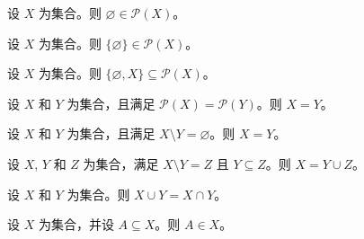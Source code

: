 \begin{chapex} %
设 $X$ 为集合。则 $\varnothing \in \mathcal{P}(X)$。
\end{chapex}

\begin{chapex} %
设 $X$ 为集合。则 $\{ \varnothing \} \in \mathcal{P}(X)$。
\end{chapex}

\begin{chapex} %
设 $X$ 为集合。则 $\{ \varnothing, X \} \subseteq \mathcal{P}(X)$。
\end{chapex}

\begin{chapex} %
设 $X$ 和 $Y$ 为集合，且满足 $\mathcal{P}(X) = \mathcal{P}(Y)$。则 $X = Y$。
\end{chapex}

\begin{chapex} %
设 $X$ 和 $Y$ 为集合，且满足 $X \setminus Y = \varnothing$。则 $X = Y$。
\end{chapex}

\begin{chapex} %
设 $X$, $Y$ 和 $Z$ 为集合，满足 $X \setminus Y = Z$ 且 $Y \subseteq Z$。则 $X = Y \cup Z$。
\end{chapex}

\begin{chapex} %
设 $X$ 和 $Y$ 为集合。则 $X \cup Y = X \cap Y$。
\end{chapex}

\begin{chapex} %
\label{cqSetsASNEnd}
设 $X$ 为集合，并设 $A \subseteq X$。则 $A \in X$。
\end{chapex}